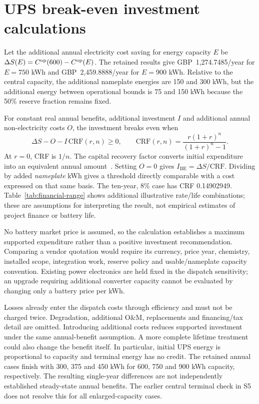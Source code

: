 \section{\textcolor{LatestGreen}{UPS break-even investment calculations}}
Let the additional annual \textcolor{LatestGreen}{electricity cost} saving for energy capacity $E$ be $\Delta S(E)=C^{\mathrm{op}}(600)-C^{\mathrm{op}}(E)$. The retained results give GBP~1,274.7485/year for $E=750$ kWh and GBP~2,459.8888/year for $E=900$ kWh. Relative to the central capacity, the additional nameplate energies are 150 and 300 kWh, but the additional energy between operational bounds is 75 and 150 kWh because the 50\% reserve fraction remains fixed.

For constant real annual benefits, additional investment $I$ and additional annual non-electricity costs $O$, \textcolor{LatestGreen}{the investment breaks even when}
\begin{equation}
\Delta S-O-I\,\mathrm{CRF}(r,n)\geq0,\qquad
\mathrm{CRF}(r,n)=\frac{r(1+r)^n}{(1+r)^n-1}.
\end{equation}
At $r=0$, CRF is $1/n$. The capital recovery factor converts initial expenditure into an equivalent annual amount~\cite{sam_crf}. Setting $O=0$ gives $I_{\mathrm{BE}}=\Delta S/\mathrm{CRF}$. Dividing by added \emph{nameplate} kWh gives a threshold directly comparable with a cost expressed on that same basis. The ten-year, 8\% case has CRF 0.14902949. Table~\ref{tab:financial-range} shows additional illustrative rate/life combinations; these are assumptions for interpreting the result, not empirical estimates of project finance or battery life.



No battery market price is assumed, so the calculation establishes a maximum supported expenditure rather than a positive investment recommendation. Comparing a vendor quotation would require its currency, price year, chemistry, installed scope, integration work, reserve policy and usable/nameplate capacity convention. Existing power electronics are held fixed in the dispatch sensitivity; an upgrade requiring additional converter capacity cannot be evaluated by changing only a battery price per kWh.

Losses already enter the dispatch costs through efficiency and must not be charged twice. Degradation, additional O\&M, replacements and financing/tax detail are omitted. Introducing additional costs reduces supported investment under the same annual-benefit assumption. A more complete lifetime treatment could also change the benefit itself. In particular, initial UPS energy is proportional to capacity and terminal energy has no credit. The retained annual cases finish with 300, 375 and 450 kWh for 600, 750 and 900 kWh capacity, respectively. The resulting single-year differences are not independently established steady-state annual benefits. The earlier central terminal check in S5 does not resolve this for all enlarged-capacity cases.

